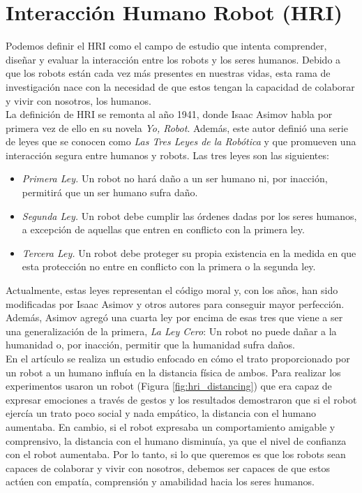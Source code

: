 \section{Interacción Humano Robot (HRI)}
\label{sec:interaccion_humano_robot}

Podemos definir el HRI como el campo de estudio que intenta comprender, diseñar y evaluar la interacción entre los robots y los seres humanos. Debido a que los robots están cada vez más presentes en nuestras vidas, esta rama de investigación nace con la necesidad de que estos tengan la capacidad de colaborar y vivir con nosotros, los humanos.\\

La definición de HRI se remonta al año 1941, donde Isaac Asimov habla por primera vez de ello en su novela \textit{Yo, Robot}. Además, este autor definió una serie de leyes que se conocen como \textit{Las Tres Leyes de la Robótica} y que promueven una interacción segura entre humanos y robots. Las tres leyes son las siguientes:

\begin{itemize}
    \item \textit{Primera Ley.} Un robot no hará daño a un ser humano ni, por inacción, permitirá que un ser humano sufra daño.
    \item \textit{Segunda Ley.} Un robot debe cumplir las órdenes dadas por los seres humanos, a excepción de aquellas que entren en conflicto con la primera ley.
    \item \textit{Tercera Ley.} Un robot debe proteger su propia existencia en la medida en que esta protección no entre en conflicto con la primera o la segunda ley.
\end{itemize}

Actualmente, estas leyes representan el código moral y, con los años, han sido modificadas por Isaac Asimov y otros autores para conseguir mayor perfección. Además, Asimov agregó una cuarta ley por encima de esas tres que viene a ser una generalización de la primera, \textit{La Ley Cero}: Un robot no puede dañar a la humanidad o, por inacción, permitir que la humanidad sufra daños.\\

En el artículo \cite{hri_distancing} se realiza un estudio enfocado en cómo el trato proporcionado por un robot a un humano influía en la distancia física de ambos. Para realizar los experimentos usaron un robot (Figura \ref{fig:hri_distancing}) que era capaz de expresar emociones a través de gestos y los resultados demostraron que si el robot ejercía un trato poco social y nada empático, la distancia con el humano aumentaba. En cambio, si el robot expresaba un comportamiento amigable y comprensivo, la distancia con el humano disminuía, ya que el nivel de confianza con el robot aumentaba. Por lo tanto, si lo que queremos es que los robots sean capaces de colaborar y vivir con nosotros, debemos ser capaces de que estos actúen con empatía, comprensión y amabilidad hacia los seres humanos.\\

